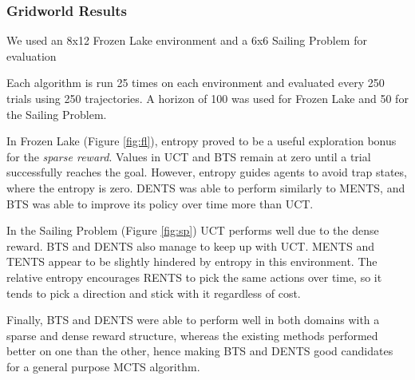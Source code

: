         \subsubsection{Gridworld Results}


             We used an 8x12 Frozen Lake environment and a 6x6 Sailing Problem for evaluation

            Each algorithm is run 25 times on each environment and evaluated every 250 trials using 250 trajectories. 
            A horizon of 100 was used for Frozen Lake and 50 for the Sailing Problem.

            In Frozen Lake (Figure \ref{fig:fl}), entropy proved to be a useful exploration bonus for the \textit{sparse reward}. Values in UCT and BTS remain at zero until a trial successfully reaches the goal. However, entropy guides agents to avoid trap states, where the entropy is zero. DENTS was able to perform similarly to MENTS, and BTS was able to improve its policy over time more than UCT.

            In the Sailing Problem (Figure \ref{fig:sp}) UCT performs well due to the dense reward. BTS and DENTS also manage to keep up with UCT. MENTS and TENTS appear to be slightly hindered by entropy in this environment. The relative entropy encourages RENTS to pick the same actions over time, so it tends to pick a direction and stick with it regardless of cost.
            
            Finally, BTS and DENTS were able to perform well in both domains with a sparse and dense reward structure, whereas the existing methods performed better on one than the other, hence making BTS and DENTS good candidates for a general purpose MCTS algorithm.
            
